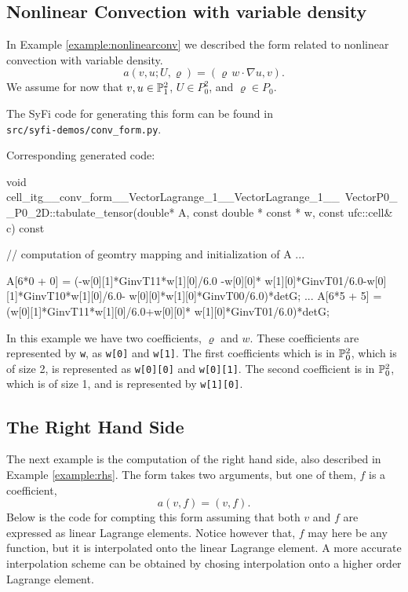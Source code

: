\subsection{Nonlinear Convection with variable density} 
In Example \ref{example:nonlinearconv} we described the
form related to nonlinear convection with variable density. 
\begin{equation}
a(v,u; U,\varrho) = ( \varrho \, w \cdot \nabla  u, v). 
\end{equation}
We assume for now that 
$v, u \in \P_1^2$, $U\in P_0^2$, and  $\varrho \in P_0$.


The SyFi code for generating this form can be found in \\
\texttt{src/syfi-demos/conv\_form.py}.

Corresponding generated code: 
\begin{code}
void cell_itg__conv_form__VectorLagrange_1__VectorLagrange_1__\
     VectorP0__P0_2D::tabulate_tensor(double* A, 
     const double * const * w, const ufc::cell& c) const
{
  // computation of geomtry mapping and initialization of A ...
  
  A[6*0 + 0] = (-w[0][1]*GinvT11*w[1][0]/6.0 -w[0][0]*
      w[1][0]*GinvT01/6.0-w[0][1]*GinvT10*w[1][0]/6.0-
      w[0][0]*w[1][0]*GinvT00/6.0)*detG;
   ...
  A[6*5 + 5] = (w[0][1]*GinvT11*w[1][0]/6.0+w[0][0]*
      w[1][0]*GinvT01/6.0)*detG;
}
\end{code}

In this example we have two coefficients, $\varrho$ and $w$. These 
coefficients are represented by \texttt{w}, as \texttt{w[0]} and \texttt{w[1]}. The first coefficients
which is in $\P_0^2$, which is of size 2, is represented as 
\texttt{w[0][0]} and \texttt{w[0][1]}. The second coefficient 
is in $\P_0^2$, which is of size 1, and is represented by \texttt{w[1][0]}.  

\subsection{The Right Hand Side}
The next example is the computation of the right hand side, also described in 
Example \ref{example:rhs}. The form takes two arguments, 
but one of them, $f$ is a coefficient,  
\begin{equation}
a(v,f) = (v,f). 
\end{equation}
Below is the code for compting this form assuming that both 
$v$ and $f$ are expressed as linear Lagrange elements. 
Notice  however that, $f$ may here be any function, 
but it is interpolated onto the linear Lagrange element. 
A more accurate interpolation scheme can be obtained 
by chosing interpolation onto a higher order Lagrange element. 



